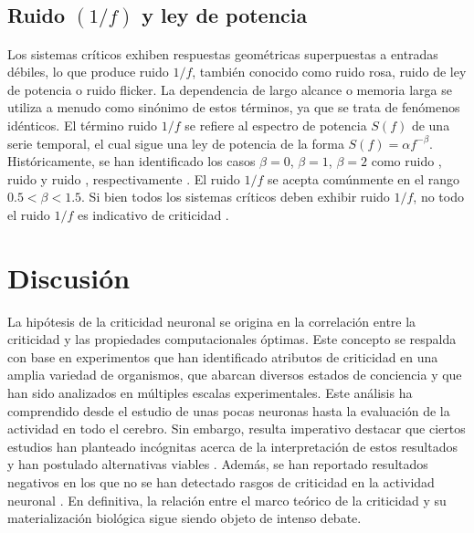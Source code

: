\subsection{Ruido $(1/ f )$ y ley de potencia}

Los sistemas críticos exhiben respuestas geométricas superpuestas a entradas débiles, lo que produce ruido $1/f$, también conocido como ruido rosa, ruido de ley de potencia o ruido flicker. La dependencia de largo alcance o memoria larga se utiliza a menudo como sinónimo de estos términos, ya que se trata de fenómenos idénticos. El término ruido $1/f$ se refiere al espectro de potencia $S(f)$ de una serie temporal, el cual sigue una ley de potencia de la forma $S( f ) = \alpha f^{-\beta}$. Históricamente, se han identificado los casos $\beta=0$, $\beta=1$, $\beta=2$ como ruido , ruido   y ruido , respectivamente \cite{li_fractal_2005}. El ruido $1/f$ se acepta comúnmente en el rango  $0.5 < \beta < 1.5$. Si bien todos los sistemas críticos deben exhibir ruido $1/f$, no todo el ruido $1/f$ es indicativo de criticidad \cite{bedard_does_2006,hesse_self-organized_2014}. 



\section{Discusión}


La hipótesis de la criticidad neuronal se origina en la correlación entre la criticidad y las propiedades computacionales óptimas. Este concepto se respalda con base en experimentos que han identificado atributos de criticidad en una amplia variedad de organismos, que abarcan diversos estados de conciencia y que han sido analizados en múltiples escalas experimentales. Este análisis ha comprendido desde el estudio de unas pocas neuronas hasta la evaluación de la actividad en todo el cerebro. Sin embargo, resulta imperativo destacar que ciertos estudios han planteado incógnitas acerca de la interpretación de estos resultados \cite{clauset_power-law_2009} y han postulado alternativas viables \cite{botcharova_power-law_2012,galinsky_neuronal_2023}. Además, se han reportado resultados negativos en los que no se han detectado rasgos de criticidad en la actividad neuronal \cite{yu_scale-invariant_2014,bedard_does_2006,dehghani_avalanche_2012}. En definitiva, la relación entre el marco teórico de la criticidad y su materialización biológica sigue siendo objeto de intenso debate.


